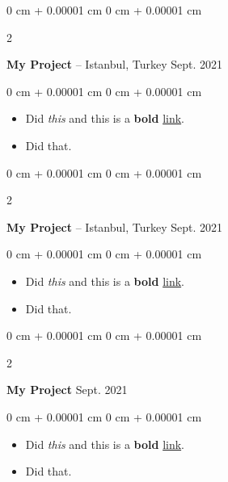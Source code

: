 \documentclass[10pt, letterpaper]{article}
\newenvironment{highlights}{
    \begin{itemize}[
        topsep=0.10 cm,
        parsep=0.10 cm,
        partopsep=0pt,
        itemsep=0pt,
        leftmargin=0 cm + 10pt
    ]
}{
    \end{itemize}
        
    \vspace{-0.10cm}
} %
\newenvironment{onecolentry}{
    \begin{adjustwidth}{
        0 cm + 0.00001 cm
    }{
        0 cm + 0.00001 cm
    }
}{
    \end{adjustwidth}
} %
\newenvironment{twocolentry}[2][]{
    \onecolentry
    \def\secondColumn{#2}
    \setcolumnwidth{\fill, 4.1 cm}
    \begin{paracol}{2}
}{
    \switchcolumn \raggedleft \secondColumn
    \end{paracol}
    \endonecolentry
} %
\begin{document}
        \vspace{0.15 cm}

        \begin{twocolentry}{
            Sept. 2021
        }
            \textbf{My Project} -- Istanbul, Turkey\end{twocolentry}

        \vspace{0.10 cm}
        \begin{onecolentry}
            \begin{highlights}
                \item Did \textit{this} and this is a \textbf{bold} \href{https://example.com}{link}.
                \item Did that.
            \end{highlights}
        \end{onecolentry}


        \vspace{0.15 cm}

        \begin{twocolentry}{
            Sept. 2021
        }
            \textbf{My Project} -- Istanbul, Turkey\end{twocolentry}

        \vspace{0.10 cm}
        \begin{onecolentry}
            \begin{highlights}
                \item Did \textit{this} and this is a \textbf{bold} \href{https://example.com}{link}.
                \item Did that.
            \end{highlights}
        \end{onecolentry}


        \vspace{0.15 cm}

        \begin{twocolentry}{
            Sept. 2021
        }
            \textbf{My Project}\end{twocolentry}

        \vspace{0.10 cm}
        \begin{onecolentry}
            \begin{highlights}
                \item Did \textit{this} and this is a \textbf{bold} \href{https://example.com}{link}.
                \item Did that.
            \end{highlights}
        \end{onecolentry}
\end{document}
